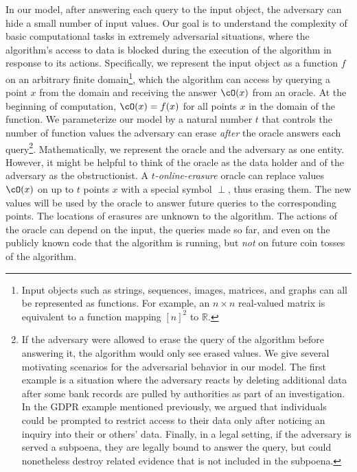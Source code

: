 \documentclass[11pt]{article}
\numberwithin{equation}{section}
\theoremstyle{definition}
\theoremstyle{plain}
\begin{document}
In our model, after answering each query to the input object, the adversary can hide a small number of input values. Our goal is to understand the complexity of basic computational tasks in extremely adversarial situations, where the algorithm's access to data is blocked during the execution of the algorithm in response to its actions.
Specifically, we represent the input object as a function $f$ on an arbitrary finite domain\footnote{Input objects such as strings, sequences, images, matrices, and graphs can all be represented as functions. For example, an $n \times n$ real-valued matrix is equivalent to a function mapping $[n]^2$ to $\mathbb{R}$.}, which the algorithm can access by querying a point $x$ from the domain and receiving the answer $\cO(x)$ from %
an
oracle. At the beginning of computation, $\cO(x)=f(x)$ for all points $x$ in the domain of the function. We parameterize our model by a natural number $t$ that controls the number of function values the adversary %
can erase {\em after} the oracle %
answers each query\footnote{If the adversary were allowed to erase the query of the algorithm before answering it, the algorithm would only see erased values. We give several motivating scenarios for the adversarial behavior in our model. The first example is a situation where the adversary reacts by deleting additional data after some bank records are pulled by authorities as part of an investigation. In the GDPR example mentioned previously, we argued that individuals could be prompted to restrict access to their data only after noticing an inquiry into their or others' data. Finally, in a legal setting, if the adversary is served a subpoena, they are legally bound to answer the query, but could nonetheless destroy related evidence that is not included in the subpoena.}. 
Mathematically, we represent the oracle and the adversary as one entity. However, it might be helpful to think of the oracle as the data holder and of the adversary as the obstructionist.
A {\em $t$-online-erasure} oracle can replace values $\cO(x)$ on up to $t$ points $x$ with a special symbol $\perp$, thus erasing them.
The new values will be used by the oracle to answer future queries to the corresponding points. The locations of erasures are unknown to the algorithm.
The actions of the oracle can depend on the input, the queries made so far, and even on the publicly known code that the algorithm is running, but {\em not} on future coin tosses of the algorithm. 
\end{document}
